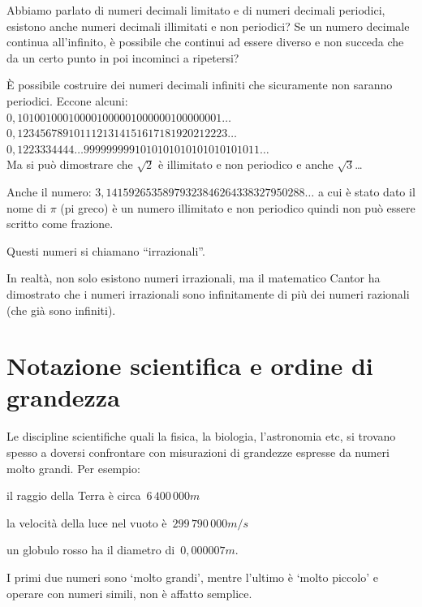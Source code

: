 \begin{osservazione}
 Abbiamo parlato di numeri decimali limitato e di numeri decimali 
periodici, esistono anche numeri decimali illimitati e non periodici?
Se un numero decimale continua all'infinito, è possibile che continui ad 
essere diverso e non succeda che da un certo punto in poi incominci a 
ripetersi?

È possibile costruire dei numeri decimali infiniti che sicuramente non 
saranno periodici. Eccone alcuni:\\
\(0,101001000100001000001000000100000001\dots\)\\
\(0,1234567891011121314151617181920212223\dots\)\\
\(0,1223334444\dots9999999991010101010101010101011\dots\)\\
Ma si può dimostrare che \(\sqrt{2}\) è illimitato e non periodico
e anche \(\sqrt{3}\)\dots 

Anche il numero: \(3,14159265358979323846264338327950288\dots\) a cui è 
stato dato il nome di \(\pi\) (pi greco) è un numero 
illimitato e non periodico quindi non può essere scritto come frazione.

Questi numeri si chiamano ``irrazionali''.

In realtà, non solo esistono numeri irrazionali, ma il matematico Cantor ha 
dimostrato che i numeri irrazionali sono infinitamente di più dei numeri 
razionali (che già sono infiniti).
\end{osservazione}

\section{Notazione scientifica e ordine di grandezza}
\label{sec:razionali_notazione_scientifica}

Le discipline scientifiche quali la fisica, la biologia, l'astronomia etc,
si trovano spesso a doversi confrontare con misurazioni di grandezze 
espresse 
da numeri molto grandi. Per esempio:

\begin{itemize*}
\item il raggio della Terra è circa~\(6\,400\,000\unit{m}\)
\item la velocità della luce nel vuoto è~\(299\,790\,000\unit{m/s}\)
\item un globulo rosso ha il diametro di~\(0,000007\unit{m}\).
\end{itemize*}

I primi due numeri sono `molto grandi', mentre l'ultimo è `molto piccolo' e 
operare con numeri simili, non è affatto semplice.

